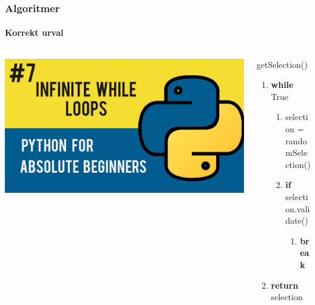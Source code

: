 \documentclass{beamer}
\begin{document}
\begin{frame}
    \frametitle{Algoritmer}
    \framesubtitle{Korrekt urval}
    
    \begin{columns}
        \begin{column}{0.5\textwidth}
            \includegraphics[width=\textwidth]{inf.jpg}
        \end{column}
        \begin{column}{0.5\textwidth}
            getSelection()
            \begin{enumerate}
                \item \textbf{while} True
                \begin{enumerate}
                    \item selection = randomSelection()
                    \item \textbf{if} selection.validate()
                    \begin{enumerate}
                        \item \textbf{break}
                    \end{enumerate}
                \end{enumerate}
                \item \textbf{return} selection
            \end{enumerate}
        \end{column}
    \end{columns}

    
  
\end{frame}
\end{document}
